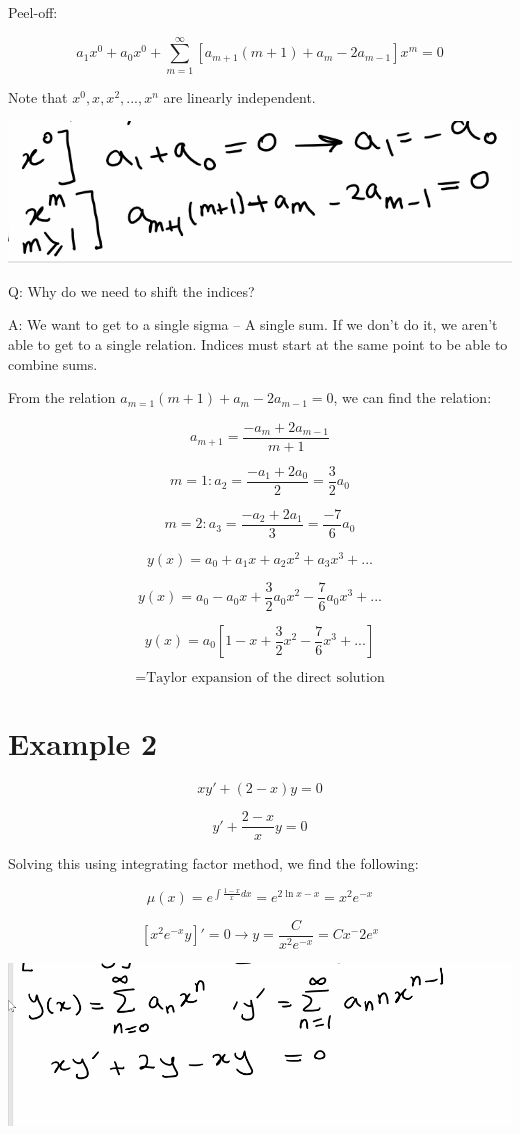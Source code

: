 Peel-off:

$$a_1 x^0 + a_0 x^0 + \sum_{m = 1}^{\infty} \left[a_{m+1} (m+1) + a_m - 2 a_{m-1} \right] x^m = 0$$

Note that $x^0, x, x^2, ..., x^n$ are linearly independent. 

\includegraphics[width = 0.7 \textwidth]{image2.png}

Q: Why do we need to shift the indices?

A: We want to get to a single sigma -- A single sum. If we don't do it, we aren't able to get to a single relation. Indices must start at the same point to be able to combine sums. 

From the relation $a_{m=1} (m+1) + a_m - 2 a_{m-1} = 0$, we can find the relation:

$$a_{m+1} = \frac{-a_m + 2 a_{m-1}}{m+1}$$

$$m = 1: a_2 = \frac{-a_1 + 2 a_0}{2} = \frac{3}{2} a_0$$

$$m = 2: a_3 = \frac{-a_2 + 2 a_1}{3} = \frac{-7}{6} a_0$$

$$y(x) = a_0 + a_1 x + a_2 x^2 + a_3 x^3 + ...$$

$$ y(x) = a_0 - a_0 x + \frac{3}{2} a_0 x^2 - \frac{7}{6} a_0 x^3 + ...$$

$$y(x) = a_0 \left[ 1 - x + \frac{3}{2} x^2 - \frac{7}{6} x^3 + ... 
\right]$$

$$ = \text{Taylor expansion of the direct solution}$$

\section{Example 2}

$$ x y' + (2 - x) y = 0$$

$$ y' + \frac{2-x}{x} y = 0$$

Solving this using integrating factor method, we find the following:

$$\mu(x) = e^{\int \frac{1-x}{x} dx} = e^{2 \ln x - x} = x^2 e^{-x}$$

$$\left[x^2 e^{-x} y \right]' = 0 \rightarrow y = \frac{C}{x^2 e^{-x}} = C x^-2 e^x$$

\includegraphics[width = 0.9 \textwidth]{image3.png}

